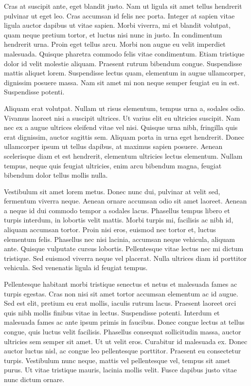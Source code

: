 Cras at suscipit ante, eget blandit justo. Nam ut ligula sit amet tellus
hendrerit pulvinar ut eget leo. Cras accumsan id felis nec porta. Integer at
sapien vitae ligula auctor dapibus ut vitae sapien. Morbi viverra, mi et
blandit volutpat, quam neque pretium tortor, et luctus nisi nunc in justo. In
condimentum hendrerit urna. Proin eget tellus arcu. Morbi non augue eu velit
imperdiet malesuada. Quisque pharetra commodo felis vitae condimentum. Etiam
tristique dolor id velit molestie aliquam. Praesent rutrum bibendum congue.
Suspendisse mattis aliquet lorem. Suspendisse lectus quam, elementum in augue
ullamcorper, dignissim posuere massa. Nam sit amet mi non neque semper feugiat
eu in est. Suspendisse potenti.

Aliquam erat volutpat. Nullam ut risus elementum, tempus urna a, sodales odio.
Vivamus laoreet nisi a suscipit ultrices. Ut varius elit eu ultricies suscipit.
Nam nec ex a augue ultrices eleifend vitae vel nisi. Quisque urna nibh,
fringilla quis erat dignissim, auctor sagittis sem. Aliquam porta in urna eget
hendrerit. Donec ullamcorper ipsum ut tellus dapibus, at maximus sapien
posuere. Aenean scelerisque diam et est hendrerit, elementum ultricies lectus
elementum. Nullam tempus, neque quis feugiat ultricies, enim arcu bibendum
magna, feugiat bibendum dolor tellus mollis nulla.

Vestibulum sit amet lorem metus. Donec nunc dui, pulvinar at velit sed,
fermentum viverra neque. Aenean ornare accumsan odio sit amet laoreet. Aenean a
neque id dui commodo tempor a sodales lacus. Phasellus tempus libero et turpis
interdum, in lobortis velit mattis. Morbi turpis mi, facilisis ac nibh id,
aliquam accumsan tortor. Proin nisi eros, euismod nec tortor et, luctus
elementum felis. Phasellus nec nisi lacinia, accumsan neque vehicula, aliquam
ante. Quisque vulputate cursus lobortis. Pellentesque vitae lectus nec mi
dictum tristique. Sed euismod viverra neque vel placerat. Nulla ultrices diam
id porttitor vehicula. Sed venenatis ligula id feugiat tempus.

Pellentesque habitant morbi tristique senectus et netus et malesuada fames ac
turpis egestas. Cras non nisi sit amet tortor accumsan elementum ac id augue.
Sed est elit, pretium eu erat mollis, iaculis rutrum lacus. Praesent laoreet
orci quis nibh mollis finibus vitae in lectus. Suspendisse potenti. Interdum et
malesuada fames ac ante ipsum primis in faucibus. Donec congue lectus at tellus
congue, quis luctus velit facilisis. Phasellus consequat sollicitudin massa,
auctor ultricies sem semper sit amet. Ut ut velit eros. Curabitur id malesuada
ex. Donec auctor luctus nisl, ac congue leo pellentesque porttitor. Praesent eu
consectetur turpis. Vestibulum nunc neque, mattis vel pellentesque vel, tempus
sit amet purus. Ut vitae tristique mauris, lacinia mollis velit. Fusce dapibus
justo vitae nunc dictum ornare.

